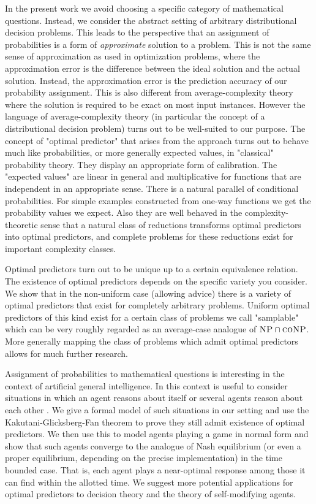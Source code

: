 \documentclass{article}
\theoremstyle{definition}
\theoremstyle{plain}
\begin{document}
In the present work we avoid choosing a specific category of mathematical questions. Instead, we consider the abstract setting of arbitrary distributional decision problems. This leads to the perspective that an assignment of probabilities is a form of \emph{approximate} solution to a problem. This is not the same sense of approximation as used in optimization problems, where the approximation error is the difference between the ideal solution and the actual solution. Instead, the approximation error is the prediction accuracy of our probability assignment. This is also different from average-complexity theory where the solution is required to be exact on most input instances. However the language of average-complexity theory (in particular the concept of a distributional decision problem) turns out to be well-suited to our purpose.
The concept of "optimal predictor" that arises from the approach turns out to behave much like probabilities, or more generally expected values, in "classical" probability theory. They display an appropriate form of calibration. The "expected values" are linear in general and multiplicative for functions that are independent in an appropriate sense. There is a natural parallel of conditional probabilities. For simple examples constructed from one-way functions we get the probability values we expect. Also they are well behaved in the complexity-theoretic sense that a natural class of reductions transforms optimal predictors into optimal predictors, and complete problems for these reductions exist for important complexity classes.

Optimal predictors turn out to be unique up to a certain equivalence relation. The existence of optimal predictors depends on the specific variety you consider. We show that in the non-uniform case (allowing advice) there is a variety of optimal predictors that exist for completely arbitrary problems. Uniform optimal predictors of this kind exist for a certain class of problems we call "samplable" which can be very roughly regarded as an average-case analogue of $\textsc{NP} \cap \textsc{coNP}$. More generally mapping the class of problems which admit optimal predictors allows for much further research.

Assignment of probabilities to mathematical questions is interesting in the context of artificial general intelligence\cite{Hutter_2013,Christiano_2014}. In this context is useful to consider situations in which an agent reasons about itself or several agents reason about each other \cite{Fallenstein_2015}. We give a formal model of such situations in our setting and use the Kakutani-Glicksberg-Fan theorem to prove they still admit existence of optimal predictors. We then use this to model agents playing a game in normal form and show that such agents converge to the analogue of Nash equilibrium (or even a proper equilibrium, depending on the precise implementation) in the time bounded case. That is, each agent plays a near-optimal response among those it can find within the allotted time. We suggest more potential applications for optimal predictors to decision theory and the theory of self-modifying agents.
\end{document}
